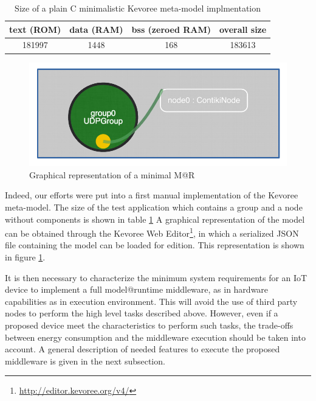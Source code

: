 \begin{table}[]
	\centering
	\caption{Size of a plain C minimalistic Kevoree meta-model implmentation}
	\label{tab:kevoreeC}
	\begin{tabular}{|c|c|c|c|}
		\hline
		\textbf{text (ROM)}   & \textbf{data (RAM)} & \textbf{bss (zeroed RAM)} & \textbf{overall size} \\ \hline
		181997 & 1448 & 168 & 183613 \\ \hline
	\end{tabular}
\end{table}

\begin{figure}[]
	\centering
	\includegraphics[width=0.55\columnwidth]{chapters/modelsAtRuntimeContiki.images/MAR_example.pdf}
	\caption{Graphical representation of a minimal M@R}
	\label{fig:1stModelC}
\end{figure}

Indeed, our efforts were put into a first manual implementation of the Kevoree meta-model.
The size of the test application which contains a group and a node without components is shown in table \ref{tab:kevoreeC}
A graphical representation of the model can be obtained through the Kevoree Web Editor\footnote{\url{http://editor.kevoree.org/v4/}}, in which a serialized JSON file containing the model can be loaded for edition.
This representation is shown in figure \ref{fig:1stModelC}.


It is then necessary to characterize the minimum system requirements for an IoT device to implement a full model@runtime middleware, as in hardware capabilities as in execution environment.
This will avoid the use of third party nodes to perform the high level tasks described above.
However, even if a proposed device meet the characteristics to perform such tasks, the trade-offs between energy consumption and the middleware execution should be taken into account.
A general description of needed features to execute the proposed middleware is given in the next subsection.

